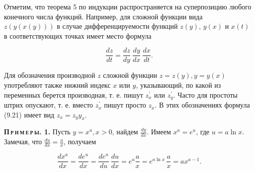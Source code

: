 \documentclass[a4paper,12pt]{article}
\begin{document}
\par Отметим, что теорема 5 по индукции распространяется на суперпозицию любого конечного числа функций. Например, для сложной функции вида $z(y(x(y)))$ в случае дифференцируемости функций $z(y)$, $y(x)$ и $x(t)$ в соответствующих точках имеет место формула

$$ \frac{dz}{dt} = \frac{dz}{dy}\:\frac{dy}{dx}\:\frac{dx}{dt}. $$

\par Для обозначения производной $z$ сложной функции $z = z(y), y = y(x)$ употребляют также нижний индекс $x$ или $y$, указывающий, по какой из переменных берется производная, т. е. пишут $z^\prime_{x}$ или $z^\prime_{y}$. Часто для простоты штрих опускают, т. е. вместо $z^\prime_{x}$ пишут просто  $z_{x}$. В этих обозначениях формула (9.21) имеет вид $z_{x} = z_{y}y_{x}$.

\par {\sffamily \textsf{\textbf{\textsc{П\,р\,и\,м\,е\,р\,ы. 1.}}}} Пусть $y = x^a, x > 0$, найдем $\frac{dy}{dx}$. Имеем $x^a = e^u$, где $u = a\ln{x}$. Замечая, что $\frac{du}{dx} = \frac{u}{x}$, получаем

$$ \frac{dx^a}{dx} = \frac{de^u}{dx} = \frac{de^u}{du}\:\frac{du}{dx} = e^u \frac{a}{x} = e^{a\ln{x}}\,\frac{a}{x} = ax^{a - 1}.$$
\end{document}
